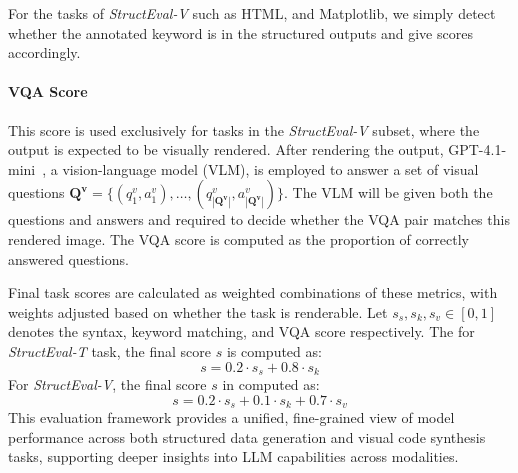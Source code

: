 For the tasks of \emph{StructEval-V} such as HTML, and Matplotlib, we simply detect whether the annotated keyword is in the structured outputs and give scores accordingly.



\paragraph{VQA Score}
This score is used exclusively for tasks in the \emph{StructEval-V} subset, where the output is expected to be visually rendered. After rendering the output, GPT-4.1-mini~\citep{Hurst2024GPT4oSC}, a vision-language model (VLM), is employed to answer a set of visual questions $\mathbf{Q^v} = \{(q^v_1, a^v_1), \dots, (q^v_{|\mathbf{Q^v}|}, a^v_{|\mathbf{Q^v}|})\}$. The VLM will be given both the questions and answers and required to decide whether the VQA pair matches this rendered image. The VQA score is computed as the proportion of correctly answered questions.

Final task scores are calculated as weighted combinations of these metrics, with weights adjusted based on whether the task is renderable. Let $s_s, s_k, s_v \in [0, 1]$ denotes the syntax, keyword matching, and VQA score respectively. The for \emph{StructEval-T} task, the final score $s$ is computed as:
\begin{equation}
s = 0.2 \cdot s_s + 0.8 \cdot s_k
\end{equation}
For \emph{StructEval-V}, the final score $s$ in computed as:
\begin{equation}
    s = 0.2 \cdot s_s + 0.1 \cdot s_k + 0.7 \cdot s_v
\end{equation}
This evaluation framework provides a unified, fine-grained view of model performance across both structured data generation and visual code synthesis tasks, supporting deeper insights into LLM capabilities across modalities.


